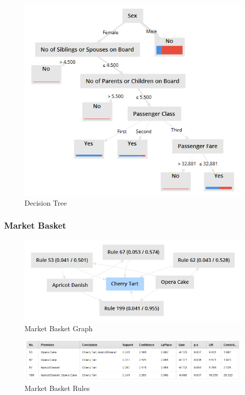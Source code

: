 \begin{figure}[H]
	\centering
	\includegraphics[width=\maxwidth{.95\linewidth}]{gfx/06-DecisionTree}
	\caption{Decision Tree}
	\label{fig06.05}
\end{figure}




\subsubsection{Market Basket}

\begin{figure}[H]
	\centering
	\includegraphics[width=\maxwidth{.95\linewidth}]{gfx/06-MarketBasketGraph}
	\caption{Market Basket Graph}
	\label{fig06.06}
\end{figure}


\begin{figure}[H]
	\centering
	\includegraphics[width=\maxwidth{.95\linewidth}]{gfx/06-MarketBasketRules}
	\caption{Market Basket Rules}
	\label{fig06.07}
\end{figure}


